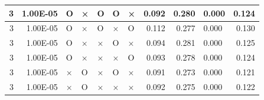 \documentclass[11pt]{article}
\begin{document}
\begin{longtable}[h]{|r|r|l|l|l|l|l|r|r|l|r|}
3                                 & 1.00E-05                         & O                                & ×                                & O                                & O                                & ×                                 & 0.092                             & 0.280                             & 0.000                              & 0.124                               \\ \hline
3                                 & 1.00E-05                         & O                                & ×                                & O                                & ×                                & O                                 & 0.112                             & 0.277                             & 0.000                              & 0.130                               \\ \hline
3                                 & 1.00E-05                         & O                                & ×                                & ×                                & O                                & ×                                 & 0.094                             & 0.281                             & 0.000                              & 0.125                               \\ \hline
3                                 & 1.00E-05                         & O                                & ×                                & ×                                & ×                                & O                                 & 0.093                             & 0.278                             & 0.000                              & 0.124                               \\ \hline
3                                 & 1.00E-05                         & ×                                & O                                & ×                                & O                                & ×                                 & 0.091                             & 0.273                             & 0.000                              & 0.121                               \\ \hline
3                                 & 1.00E-05                         & ×                                & O                                & ×                                & ×                                & ×                                 & 0.092                             & 0.275                             & 0.000                              & 0.122                               \\ \hline

\end{longtable}
\end{document}
